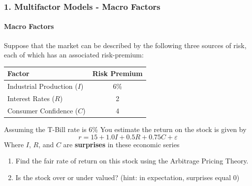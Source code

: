 \documentclass{beamer}
\begin{document}
\begin{practiceframe}[t]
    \frametitle{1. Multifactor Models - Macro Factors}
    \framesubtitle{Macro Factors}

    \footnotesize
    Suppose that the market can be described by the following three sources of risk, each of which 
        has an associated risk-premium: 

            \begin{table}
            \begin{tabular}{lc}
                \toprule
                Factor & Risk Premium\\
                \midrule
                Industrial Production ($I$) & 6\%\\
                Interest Rates ($R$) & 2\\
                Consumer Confidence ($C$) & 4\\
                \bottomrule
            \end{tabular}
            \end{table}
            
        Assuming the T-Bill rate is 6\% You estimate the return on the stock is given by
         $$r = 15 + 1.0 I + 0.5 R + 0.75 C + \varepsilon$$
         Where $I$, $R$, and $C$ are \textbf{surprises} in these economic series
         \begin{enumerate}
        \item Find the fair rate of return on this stock using the Arbitrage Pricing Theory.
            \item Is the stock over or under valued? (hint: in expectation, surprises equal 0)
        \end{enumerate}

\end{practiceframe}
\end{document}
